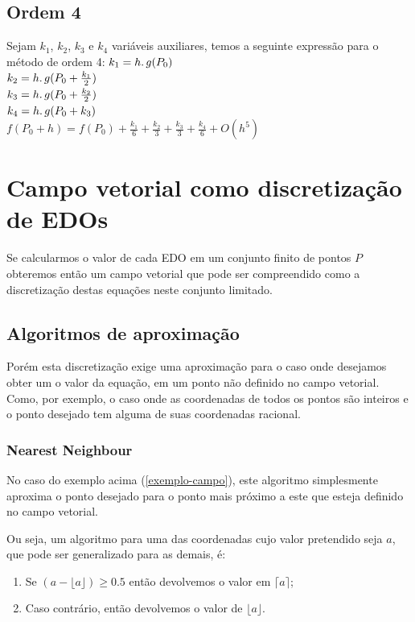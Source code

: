   \subsection{Ordem 4}
  Sejam $k_{1}$, $k_{2}$, $k_{3}$ e $k_{4}$ variáveis auxiliares, temos a seguinte expressão para o método de ordem 4:
  \newline
  \newline
  $k_{1} = h\ldotp g(P_{0})$\\
  $k_{2} = h\ldotp g(P_{0} + \frac{k_{1}}{2})$\\
  $k_{3} = h\ldotp g(P_{0} + \frac{k_{2}}{2})$\\
  $k_{4} = h\ldotp g(P_{0} + k_{3})$\\
  $f(P_{0} + h) = f(P_{0}) + \frac{k_{1}}{6} + \frac{k_{2}}{3} + \frac{k_{3}}{3} + \frac{k_{4}}{6} + O(h^{5})$

\section{Campo vetorial como discretização de EDOs}
Se calcularmos o valor de cada EDO em um conjunto finito de pontos $P$ obteremos então um campo vetorial que pode ser compreendido como a discretização destas equações neste conjunto limitado.
  \subsection{Algoritmos de aproximação}\label{aproximacao}
  Porém esta discretização exige uma aproximação para o caso onde desejamos obter um o valor da equação, em um ponto não definido no campo vetorial. \label{exemplo-campo}Como, por exemplo, o caso onde as coordenadas de todos os pontos são inteiros e o ponto desejado tem alguma de suas coordenadas racional.

    \subsubsection{Nearest Neighbour}
    No caso do exemplo acima (\ref{exemplo-campo}), este algoritmo simplesmente aproxima o ponto desejado para o ponto mais próximo a este que esteja definido no campo vetorial.

    Ou seja, um algoritmo para uma das coordenadas cujo valor pretendido seja $a$, que pode ser generalizado para as demais, é:
    
    \begin{enumerate}
      \item Se $(a - \lfloor a\rfloor) \geq  0.5$ então devolvemos o valor em $\lceil a\rceil$;
      \item Caso contrário, então devolvemos o valor de $\lfloor a\rfloor$.
    \end{enumerate}
    
